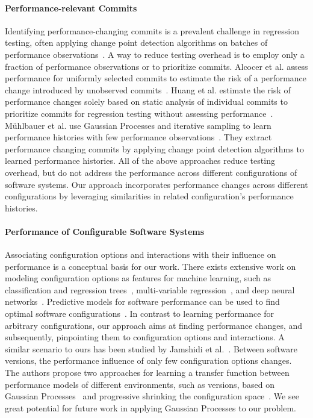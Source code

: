 \documentclass[sigconf, screen]{acmart}
\begin{document}
	\paragraph{Performance-relevant Commits} Identifying performance-changing commits is a prevalent challenge in regression testing, often applying change point detection algorithms on batches of performance observations~\cite{cityIdentifying2014,daly_industry_2020}. A way to reduce testing overhead is to employ only a fraction of performance observations or to prioritize commits. Alcocer et al. assess performance for uniformly selected commits to estimate the risk of a performance change introduced by unobserved commits~\cite{sandoval_alcocer_learning_2016,alcocer_prioritizing_2020}. Huang et al. estimate the risk of performance changes solely based on static analysis of individual commits to prioritize commits for regression testing without assessing performance~\cite{huang_performance_2014}. Mühlbauer et al. use Gaussian Processes and iterative sampling to learn performance histories with few performance observations~\cite{muhlbauer_accurate_2019}. They extract performance changing commits by applying change point detection algorithms to learned performance histories. All of the above approaches reduce testing overhead, but do not address the performance across different configurations of software systems. Our approach incorporates performance changes across different configurations by leveraging similarities in related configuration's performance histories.
	
	\paragraph{Performance of Configurable Software Systems} Associating configuration options and interactions with their influence on performance is a conceptual basis for our work. There exists extensive work on modeling configuration options as features for machine learning, such as classification and regression trees~\cite{guo_2018_data,guoVariabilityawarePerformancePrediction2013,sarkarCostEfficientSamplingPerformance,nairUsingBadLearners2017}, multi-variable regression~\cite{siegmundPerformanceinfluenceModelsHighly2015}, and deep neural networks~\cite{haDeepPerf2019}. Predictive models for software performance can be used to find optimal software configurations~\cite{nairFlash18}.
	In contrast to learning performance for arbitrary configurations, our approach aims at finding  performance changes, and subsequently, pinpointing them to configuration options and interactions.
	A similar scenario to ours has been studied by Jamshidi et al.~\cite{jamishidi_transfer_2017,jamshidi_transfer_gp_2017,jamshidi_learning_2018}. Between software versions, the performance influence of only few configuration options changes. The authors propose two approaches for learning a transfer function between performance models of different environments, such as versions, based on Gaussian Processes~\cite{jamshidi_transfer_gp_2017} and progressive shrinking the configuration space~\cite{jamshidi_learning_2018}. We see great potential for future work in applying Gaussian Processes to our problem.
	
\end{document}
